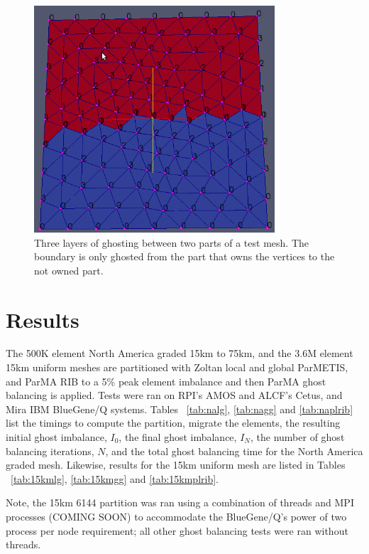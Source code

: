 \documentclass[a4paper]{article}
\begin{document}
\begin{figure}
\centering
\includegraphics[width=0.8\textwidth]{plateghosts.png}
\caption{\label{fig:ownership4} Three layers of ghosting between two parts of a test mesh.  The boundary is only ghosted from the part that owns the vertices to the not owned part.}
\end{figure}

\section{Results}

The 500K element North America graded 15km to 75km, and the 3.6M element 15km
uniform meshes are partitioned with Zoltan local and global ParMETIS, and ParMA
RIB to a 5\% peak element imbalance and then ParMA ghost balancing is applied.
Tests were ran on RPI's AMOS and ALCF's Cetus, and Mira IBM BlueGene/Q systems.
Tables ~\ref{tab:nalg}, \ref{tab:nagg} and \ref{tab:naplrib} list the timings to
compute the partition, migrate the elements, the resulting initial ghost
imbalance, $I_0$, the final ghost imbalance, $I_N$, the number of ghost
balancing iterations, $N$, and the total ghost balancing time for the North
America graded mesh.
Likewise, results for the 15km uniform mesh are listed in Tables
~\ref{tab:15kmlg}, \ref{tab:15kmgg} and \ref{tab:15kmplrib}.

Note, the 15km 6144 partition was ran using a combination of threads and MPI
processes (COMING SOON) to accommodate the BlueGene/Q's power of two process per
node requirement; all other ghost balancing tests were ran without threads.
\end{document}
